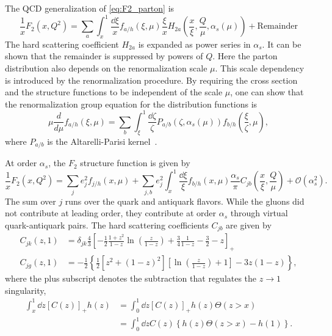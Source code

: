 \documentclass[../main.tex]{subfiles}
\begin{document}
The QCD generalization of \cref{eq:F2_parton} is
\begin{equation}
	\frac{1}{x}F_2\left(x,Q^2\right) = \sum_a \int_x^1 \frac{\dd{\xi}}{x}f_{a/h}\left(\xi,\mu\right)\frac{\xi}{x}H_{2a}\left( \frac{x}{\xi}, \frac{Q}{\mu}, \alpha_s\left(\mu\right)\right)
	+ \text{Remainder}
\end{equation}
The hard scattering coefficient $H_{2a}$ is expanded as power series in $\alpha_s$. It
can be shown that the remainder is suppressed by powers of $Q$. Here the parton
distribution also depends on the renormalization scale $\mu$. This scale
dependency is introduced by the renormalization procedure. By requiring the cross
section and the structure functions to be independent of the scale $\mu$,
one can show that the renormalization group equation for the distribution
functions is
\begin{equation}
	\mu\frac{d}{d\mu}f_{a/h}\left(\xi,\mu\right)=\sum_b \int_\xi^1 \frac{\dd{\zeta}}{\zeta} P_{a/b}\left(\zeta,\alpha_s\left(\mu\right)\right) f_{b/h}\left(\frac{\xi}{\zeta},\mu\right),
\end{equation}
where $P_{a/b}$ is the Altarelli-Parisi kernel~\cite{altarelli1977}.

At order $\alpha_s$, the $F_2$ structure function is given by~\cite{collins1989}
\begin{equation}
	\frac{1}{x} F_2\left(x,Q^2\right) = \sum_j e^2_j f_{j/h}\left(x,\mu\right) + \sum_{j,b} e^2_j \int^1_x \frac{\dd{\xi}}{\xi} f_{b/h}\left(x,\mu\right) \frac{\alpha_s}{\pi} C_{jb}\left(\frac{x}{\xi}, \frac{Q}{\mu}\right) + \mathcal{O}(\alpha_s^2).
\end{equation}
The sum over $j$ runs over the quark and antiquark flavors. While the gluons
did not contribute at leading order, they contribute at order $\alpha_s$ through
virtual quark-antiquark pairs. The hard scattering coefficients $C_{jb}$ are
given by
\begin{align}
	C_{jk}(z,1) & = \delta_{jk} \frac{4}{3} \left[ -\frac{1}{2}\frac{1+z^2}{1-z} \ln\left(\frac{z}{1-z}\right) + \frac{3}{4} \frac{1}{1-z} -\frac{3}{2} -z\right]_+ \\
	C_{jg}(z,1) & = -\frac{1}{2} \left\{ \frac{1}{2}\left[z^2+(1-z)^2\right] \left[\ln\left(\frac{z}{1-z}\right)+1\right] -3z(1-z)\right\},
\end{align}
where the plus subscript denotes the subtraction that regulates the $z\rightarrow1$
singularity,
\begin{equation}
	\begin{split}
		\int^1_x \dd{z} \left[C(z)\right]_+ h(z) & = \int_0^1 \dd{z} \left[C(z)\right]_+ h(z)\Theta(z>x)        \\
		                                         & = \int_0^1 \dd{z} C(z) \left\{h(z)\Theta(z>x) -h(1)\right\}.
	\end{split}
\end{equation}
\end{document}

